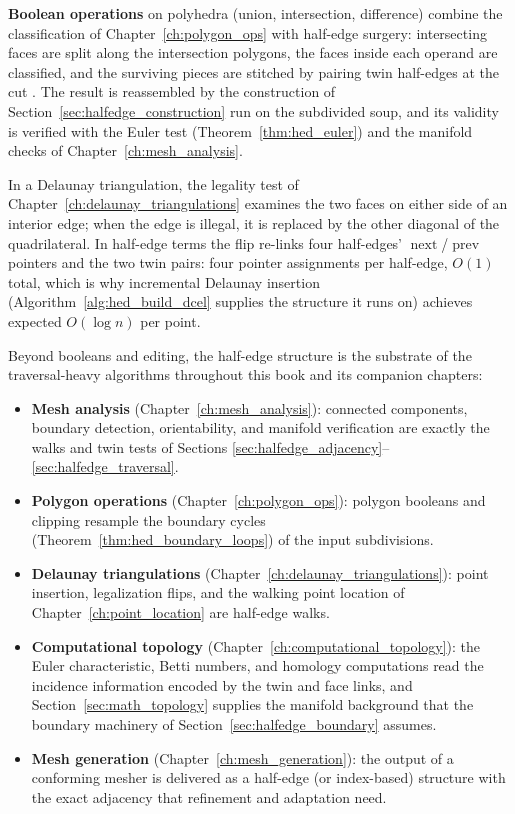\textbf{Boolean operations} on polyhedra (union, intersection,
difference) combine the classification of Chapter~\ref{ch:polygon_ops}
with half-edge surgery: intersecting faces are split along the
intersection polygons, the faces inside each operand are classified, and
the surviving pieces are stitched by pairing twin half-edges at the cut
\cite{ericson2004}. The result is reassembled by the construction of
Section~\ref{sec:halfedge_construction} run on the subdivided soup, and
its validity is verified with the Euler test
(Theorem~\ref{thm:hed_euler}) and the manifold checks of
Chapter~\ref{ch:mesh_analysis}.

\begin{example}\label{ex:hed_flip}
In a Delaunay triangulation, the legality test of
Chapter~\ref{ch:delaunay_triangulations} examines the two faces on either
side of an interior edge; when the edge is illegal, it is replaced by the
other diagonal of the quadrilateral. In half-edge terms the flip re-links
four half-edges' $\operatorname{next}$/$\operatorname{prev}$ pointers and
the two twin pairs: four pointer assignments per half-edge, $O(1)$ total,
which is why incremental Delaunay insertion (Algorithm~\ref{alg:hed_build_dcel}
supplies the structure it runs on) achieves expected $O(\log n)$ per point.
\end{example}

Beyond booleans and editing, the half-edge structure is the substrate of
the traversal-heavy algorithms throughout this book and its companion
chapters:

\begin{itemize}
  \item \textbf{Mesh analysis} (Chapter~\ref{ch:mesh_analysis}): connected
    components, boundary detection, orientability, and manifold
    verification are exactly the walks and twin tests of Sections
    \ref{sec:halfedge_adjacency}--\ref{sec:halfedge_traversal}.
  \item \textbf{Polygon operations} (Chapter~\ref{ch:polygon_ops}): polygon
    booleans and clipping resample the boundary cycles
    (Theorem~\ref{thm:hed_boundary_loops}) of the input subdivisions.
  \item \textbf{Delaunay triangulations} (Chapter~\ref{ch:delaunay_triangulations}):
    point insertion, legalization flips, and the walking point location of
    Chapter~\ref{ch:point_location} are half-edge walks.
  \item \textbf{Computational topology} (Chapter~\ref{ch:computational_topology}):
    the Euler characteristic, Betti numbers, and homology computations read
    the incidence information encoded by the twin and face links, and
    Section~\ref{sec:math_topology} supplies the manifold background that
    the boundary machinery of Section~\ref{sec:halfedge_boundary} assumes.
  \item \textbf{Mesh generation} (Chapter~\ref{ch:mesh_generation}): the
    output of a conforming mesher is delivered as a half-edge (or
    index-based) structure with the exact adjacency that refinement and
    adaptation need.
\end{itemize}


